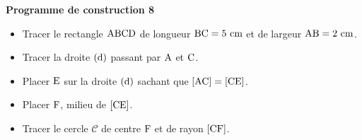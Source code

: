 \documentclass[exercice,a4]{thedocument}%
\begin{document}
%
\noindent\textbf{Programme de construction 8}\par\smallskip\noindent
\begin{itemize}
    \item Tracer le rectangle $\text{ABCD}$ de longueur
    $\text{BC}=5\text{ cm}$ et de largeur $\text{AB}=2\text{ cm}$.
    \item Tracer la droite $(\text{d})$ passant par
    $\text{A}$ et $\text{C}$.
    \item Placer $\text{E}$ sur la droite $(\text{d})$ sachant
    que $[\text{AC}]=[\text{CE}]$.
    \item Placer $\text{F}$, milieu de $[\text{CE}]$.
    \item Tracer le cercle $\mathcal{C}$ de centre $\text{F}$ et de
    rayon $[\text{CF}]$.
\end{itemize}
\end{document}
